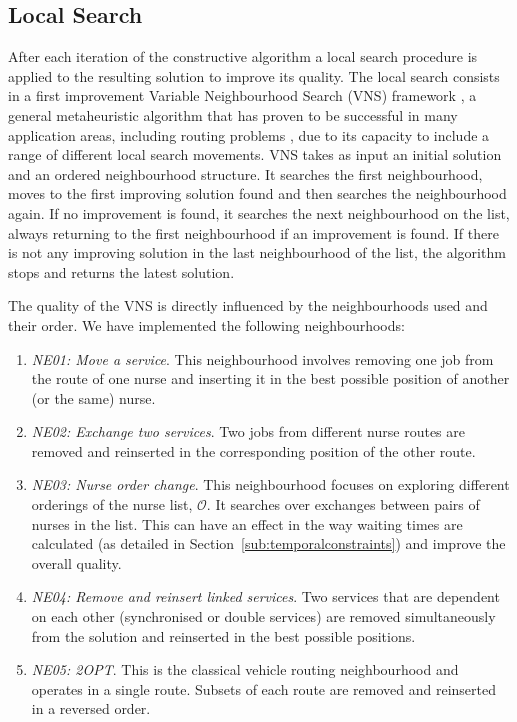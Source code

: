\documentclass[a4paper,11pt,authoryear]{elsarticle}
\begin{document}
\subsection{Local Search}
\label{sub:localsearch}
\noindent After each iteration of the constructive algorithm a local search procedure is applied to the resulting solution to improve its quality. The local search consists in a first improvement Variable Neighbourhood Search (VNS) framework \citep{mladenovic1997}, a general metaheuristic algorithm that has proven to be successful in many application areas, including routing problems \citep{hansen2010}, due to its capacity to include a range of different local search movements. VNS takes as input an initial solution and an ordered neighbourhood structure. It searches the first neighbourhood, moves to the first improving solution found and then searches the neighbourhood again. If no improvement is found, it searches the next neighbourhood on the list, always returning to the first neighbourhood if an improvement is found. If there is not any improving solution in the last neighbourhood of the list, the algorithm stops and returns the latest solution.

The quality of the VNS is directly influenced by the neighbourhoods used and their order. We have implemented the following neighbourhoods:
\begin{enumerate}[label={(\arabic*)}]
    \item \textit{NE01: Move a service}. This neighbourhood involves removing one job from the route of one nurse and inserting it in the best possible position of another (or the same) nurse.
    \item \textit{NE02: Exchange two services}. Two jobs from different nurse routes are removed and reinserted in the corresponding position of the other route.
    \item \textit{NE03: Nurse order change}. This neighbourhood focuses on exploring different orderings of the nurse list, $\mathcal{O}$. It searches over exchanges between pairs of nurses in the list. 
    This can have an effect in the way waiting times are calculated (as detailed in Section~\ref{sub:temporalconstraints}) and improve the overall quality.
    \item \textit{NE04: Remove and reinsert linked services}. Two services that are dependent on each other (synchronised or double services) are removed simultaneously from the solution and reinserted in the best possible positions.
    \item \textit{NE05: 2OPT}. This is the classical vehicle routing neighbourhood and operates in a single route. Subsets of each route are removed and reinserted in a reversed order.
\end{enumerate}
\end{document}
